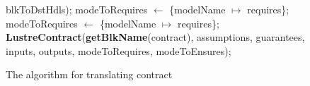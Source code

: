 \documentclass{article}
\begin{document}
\begin{figure}
\begin{algorithmic}
\State {\ \ \ \ \ \ \ \ \ \ \ \ \ \ \ \ \ \ \ \ \ \ \ \ \ \ \ \ \ \ \ \ \ \ \ \ \ \ \ \ \ \ \ \ \ \ \ \ \ \ \ \ \ \ \ \ \ \ \ \ \ \ \ \ \ \ \ \ \ \ \ \ \ \ \ \ \ \ \ \ \ \ \ \ \ \ \ \ } blkToDstHdls);
\State {\ \ \ \ \ \ \ \ \ \ \ \ \ \ \ \ \ \ \ \ \ \ } modeToRequires $\leftarrow$ \{modelName $\mapsto$ requires\};
\State {\ \ \ \ \ \ \ \ \ \ \ \ \ \ \ \ \ \ \ \ \ \ } modeToRequires $\leftarrow$ \{modelName $\mapsto$ requires\};
\State \textbf{LustreContract}(\textbf{getBlkName}(contract), assumptions, guarantees, inputs, outputs, 
\State {\ \ \ \ \ \ \ \ \ \ \ \ \ \ \ \ \ \ \ \ \ \ \ \ } modeToRequires, modeToEnsures);
\EndFunction
\end{algorithmic}
\label{translatecontract}
\caption{The algorithm for translating contract}
\end{figure}
\end{document}
